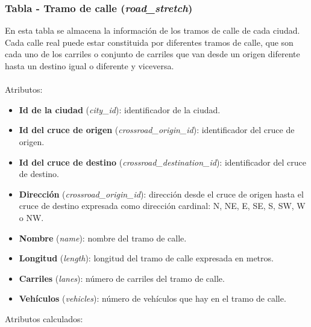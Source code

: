 \subsubsection{Tabla - Tramo de calle (\textit{road\_stretch})}
En esta tabla se almacena la información de los tramos de calle de cada ciudad. Cada calle real puede estar constituida por diferentes tramos de calle, que son cada uno de los carriles o conjunto de carriles que van desde un origen diferente hasta un destino igual o diferente y viceversa. \\\\
Atributos:
\begin{itemize}
    \item \textbf{Id de la ciudad} (\textit{city\_id}): identificador de la ciudad.
    \item \textbf{Id del cruce de origen} (\textit{crossroad\_origin\_id}): identificador del cruce de origen.
    \item \textbf{Id del cruce de destino} (\textit{crossroad\_destination\_id}): identificador del cruce de destino.
    \item \textbf{Dirección} (\textit{crossroad\_origin\_id}): dirección desde el cruce de origen hasta el cruce de destino expresada como dirección cardinal: N, NE, E, SE, S, SW, W o NW.
    \item \textbf{Nombre} (\textit{name}): nombre del tramo de calle.
    \item \textbf{Longitud} (\textit{length}): longitud del tramo de calle expresada en metros.
    \item \textbf{Carriles} (\textit{lanes}): número de carriles del tramo de calle.
    \item \textbf{Vehículos} (\textit{vehicles}): número de vehículos que hay en el tramo de calle.
\end{itemize}
Atributos calculados:
